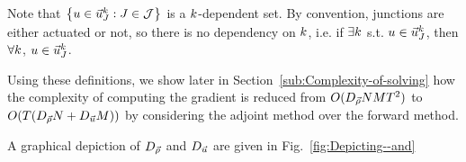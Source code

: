 Note that $\left\{ \convar\in\junccon{\jn}{\tind}:\jn\in\jns\right\} $
is a $k$-dependent set. By convention, junctions are either actuated
or not, so there is no dependency on $k$, i.e. if $\exists k$
s.t. $u\in\vec{u}_{J}^{k}$, then $\forall k$, $u\in\vec{u}_{J}^{k}$.

Using these definitions, we show later in Section~\ref{sub:Complexity-of-solving}
how the complexity of computing the gradient is reduced from $O(D_{\vec{\rho}}NMT^{2})$
to $O(\ntime\left(\degree{\state}\nlinks+\degree{\control}\ncontrols\right))$
by considering the adjoint method over the forward method.

A graphical depiction of $D_{\vec{\rho}}$ and $D_{\vec{u}}$ are given
in Fig.~\ref{fig:Depicting--and}
\begin{figure}
	\begin{centering}
\end{centering}
\end{figure}
